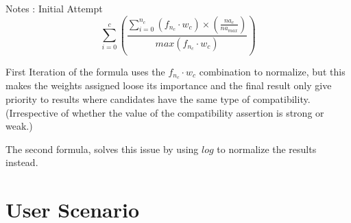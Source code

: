 \documentclass[11pt]{article}
\begin{document}
Notes : 
Initial Attempt
$$  \sum^{c}_{i=0}\left(  \frac{\sum^{n_{c}}_{i=0} \left( f_{n_{c}} \cdot w_{c}  \right) \times \left( \frac{na_{c}}{na_{max}}\right) }{max \left( f_{n_{c}} \cdot w_{c}  \right)}   \right)   $$

First Iteration of the formula uses the $f_{n_{c}} \cdot w_{c}$ combination to normalize, but this  makes the weights assigned loose its importance and the final result only give priority to results where candidates have the same type of compatibility. (Irrespective of whether the value of the compatibility assertion is strong or weak.) 

The second formula, solves this issue by using $log$ to normalize the results instead.\\

\section{User Scenario}
\end{document}

